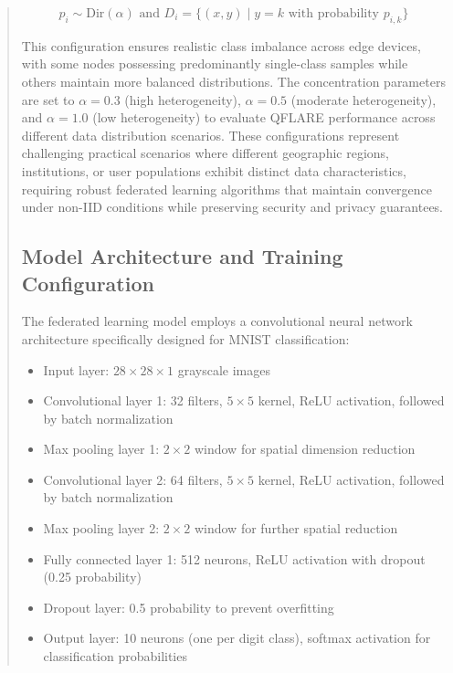 \documentclass{svproc}
\begin{document}
\begin{abstract}
\begin{equation}
p_i \sim \text{Dir}(\alpha) \text{ and } D_i = \{(x, y) \mid y = k \text{ with probability } p_{i,k}\}
\end{equation}

This configuration ensures realistic class imbalance across edge devices, with some nodes possessing predominantly single-class samples while others maintain more balanced distributions. The concentration parameters are set to $\alpha = 0.3$ (high heterogeneity), $\alpha = 0.5$ (moderate heterogeneity), and $\alpha = 1.0$ (low heterogeneity) to evaluate QFLARE performance across different data distribution scenarios. These configurations represent challenging practical scenarios where different geographic regions, institutions, or user populations exhibit distinct data characteristics, requiring robust federated learning algorithms that maintain convergence under non-IID conditions while preserving security and privacy guarantees.

\subsection{Model Architecture and Training Configuration}

The federated learning model employs a convolutional neural network architecture specifically designed for MNIST classification:

\begin{itemize}
    \item Input layer: $28 \times 28 \times 1$ grayscale images
    \item Convolutional layer 1: 32 filters, $5 \times 5$ kernel, ReLU activation, followed by batch normalization
    \item Max pooling layer 1: $2 \times 2$ window for spatial dimension reduction
    \item Convolutional layer 2: 64 filters, $5 \times 5$ kernel, ReLU activation, followed by batch normalization
    \item Max pooling layer 2: $2 \times 2$ window for further spatial reduction
    \item Fully connected layer 1: 512 neurons, ReLU activation with dropout (0.25 probability)
    \item Dropout layer: 0.5 probability to prevent overfitting
    \item Output layer: 10 neurons (one per digit class), softmax activation for classification probabilities
\end{itemize}


\end{abstract}
\end{document}
